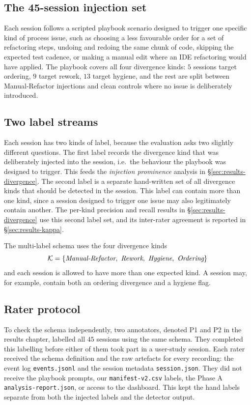 \subsection{The 45-session injection set}
\label{sec:methodology-injection-set}

Each session follows a scripted playbook scenario designed to trigger one specific kind of process issue, such as choosing a less favourable order for a set of refactoring steps, undoing and redoing the same chunk of code, skipping the expected test cadence, or making a manual edit where an IDE refactoring would have applied. The playbook covers all four divergence kinds: $5$ sessions target ordering, $9$ target rework, $13$ target hygiene, and the rest are split between Manual-Refactor injections and clean controls where no issue is deliberately introduced.

\subsection{Two label streams}
\label{sec:methodology-labels}

Each session has two kinds of label, because the evaluation asks two slightly different questions. The first label records the divergence kind that was deliberately injected into the session, i.e.\ the behaviour the playbook was designed to trigger. This feeds the \emph{injection prominence} analysis in \S\ref{sec:results-divergence}. The second label is a separate hand-written set of all divergence kinds that should be detected in the session. This label can contain more than one kind, since a session designed to trigger one issue may also legitimately contain another. The per-kind precision and recall results in \S\ref{sec:results-divergence} use this second label set, and its inter-rater agreement is reported in \S\ref{sec:results-kappa}.

The multi-label schema uses the four divergence kinds
\[
\mathcal{K} = \{\emph{Manual-Refactor},\ \emph{Rework},\ \emph{Hygiene},\ \emph{Ordering}\}
\]
and each session is allowed to have more than one expected kind. A session may, for example, contain both an ordering divergence and a hygiene flag.

\subsection{Rater protocol}
\label{sec:methodology-rater-protocol}

To check the schema independently, two annotators, denoted P1 and P2 in the results chapter, labelled all $45$ sessions using the same schema. They completed this labelling before either of them took part in a user-study session. Each rater received the schema definition and the raw artefacts for every recording: the event log \texttt{events.jsonl} and the session metadata \texttt{session.json}. They did not receive the playbook prompts, our \texttt{manifest-v2.csv} labels, the Phase A \texttt{analysis-report.json}, or access to the dashboard. This kept the hand labels separate from both the injected labels and the detector output.

